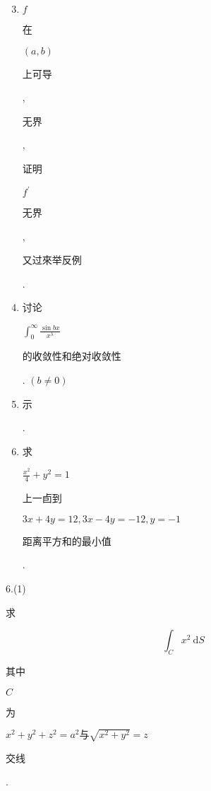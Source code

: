 \documentclass[10pt]{article}
\begin{document}
\begin{enumerate}
  \setcounter{enumi}{2}
  \item $f$ \begin{CJK}{UTF8}{mj}在\end{CJK} $(a, b)$ \begin{CJK}{UTF8}{mj}上可导\end{CJK}, \begin{CJK}{UTF8}{mj}无界\end{CJK}, \begin{CJK}{UTF8}{mj}证明\end{CJK} $f^{\prime}$ \begin{CJK}{UTF8}{mj}无界\end{CJK}, \begin{CJK}{UTF8}{mj}又过來举反例\end{CJK}.

  \item \begin{CJK}{UTF8}{mj}讨论\end{CJK} $\int_{0}^{\infty} \frac{\sin b x}{x^{\lambda}}$ \begin{CJK}{UTF8}{mj}的收敛性和绝对收敛性\end{CJK}. $(b \neq 0)$

  \item \begin{CJK}{UTF8}{mj}示\end{CJK}.

  \item \begin{CJK}{UTF8}{mj}求\end{CJK} $\frac{x^{2}}{4}+y^{2}=1$ \begin{CJK}{UTF8}{mj}上一卣到\end{CJK} $3 x+4 y=12,3 x-4 y=-12, y=-1$ \begin{CJK}{UTF8}{mj}距离平方和的最小值\end{CJK}.

\end{enumerate}
6.(1) \begin{CJK}{UTF8}{mj}求\end{CJK}
$$
\int_{C} x^{2} \mathrm{~d} S
$$
\begin{CJK}{UTF8}{mj}其中\end{CJK} $C$ \begin{CJK}{UTF8}{mj}为\end{CJK} $x^{2}+y^{2}+z^{2}=a^{2} 与 \sqrt{x^{2}+y^{2}}=z$ \begin{CJK}{UTF8}{mj}交线\end{CJK}.
\end{document}
